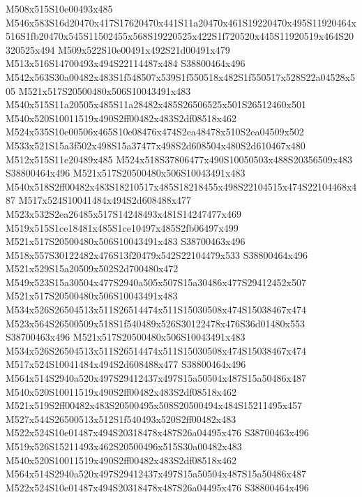 \documentclass{article}
\begin{document}
\begin{multicols}{2}
M508x515S10e00493x485 M546x583S16d20470x417S17620470x441S11a20470x461S19220470x495S11920464x516S1fb20470x545S11502455x568S19220525x422S1f720520x445S11920519x464S20320525x494 M509x522S10e00491x492S21d00491x479 M513x516S14700493x494S22114487x484 S38800464x496 M542x563S30a00482x483S1f548507x539S1f550518x482S1f550517x528S22a04528x505 M521x517S20500480x506S10043491x483 M540x515S11a20505x485S11a28482x485S26506525x501S26512460x501 M540x520S10011519x490S2ff00482x483S2df08518x462 M524x535S10e00506x465S10e08476x474S2ea48478x510S2ea04509x502 M533x521S15a3f502x498S15a37477x498S2d608504x480S2d610467x480 M512x515S11e20489x485 M524x518S37806477x490S10050503x488S20356509x483 S38800464x496 M521x517S20500480x506S10043491x483 M540x518S2ff00482x483S18210517x485S18218455x498S22104515x474S22104468x487 M517x524S10041484x494S2d608488x477 M523x532S2ea26485x517S14248493x481S14247477x469 M519x515S1ce18481x485S1ce10497x485S2fb06497x499 M521x517S20500480x506S10043491x483 S38700463x496 M518x557S30122482x476S13f20479x542S22104479x533 S38800464x496 M521x529S15a20509x502S2d700480x472 M549x523S15a30504x477S2940a505x507S15a30486x477S29412452x507 M521x517S20500480x506S10043491x483 M534x526S26504513x511S26514474x511S15030508x474S15038467x474 M523x564S26500509x518S1f540489x526S30122478x476S36d01480x553 S38700463x496 M521x517S20500480x506S10043491x483 M534x526S26504513x511S26514474x511S15030508x474S15038467x474 M517x524S10041484x494S2d608488x477 S38800464x496 M564x514S2940a520x497S29412437x497S15a50504x487S15a50486x487 M540x520S10011519x490S2ff00482x483S2df08518x462 M521x519S2ff00482x483S20500495x508S20500494x484S15211495x457 M527x544S26500513x512S1f540493x520S2ff00482x483 M522x524S10e01487x494S20318478x487S26a04495x476 S38700463x496 M519x526S15211493x462S20500496x515S30a00482x483 M540x520S10011519x490S2ff00482x483S2df08518x462 M564x514S2940a520x497S29412437x497S15a50504x487S15a50486x487 M522x524S10e01487x494S20318478x487S26a04495x476 S38800464x496





\end{multicols}
\end{document}
